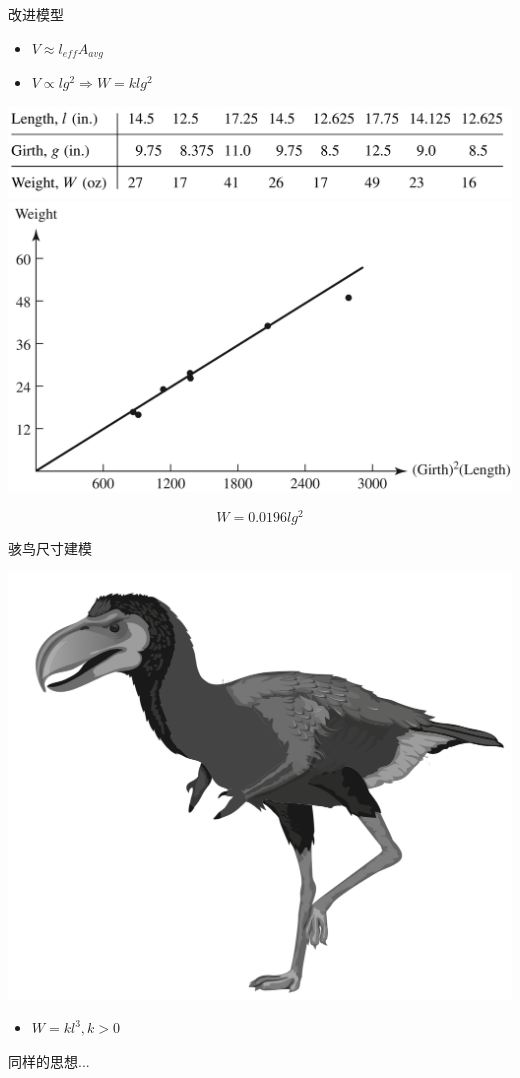 \documentclass[UTF8]{ctexbeamer}
\begin{document}
\begin{frame}{改进模型}
  \begin{itemize}
  \item $V \approx l_{eff}A_{avg}$
  \item $V \propto lg^2 \Rightarrow W = klg^2$
  \end{itemize}
  \begin{center}
    \includegraphics[width=.5\textwidth{}]{fishtab2.png}
    \includegraphics[width=.4\textwidth{}]{fishlen3.png}
  \end{center}
  \[
  W = 0.0196lg^2
  \]
\end{frame}

\begin{frame}{骇鸟尺寸建模}
  \begin{center}
    \includegraphics[width=.5\textwidth{}]{terror.png}
  \end{center}

  \begin{itemize}
  \item $W = kl^3, k>0$
  \end{itemize}

  同样的思想...
  
\end{frame}
\end{document}
